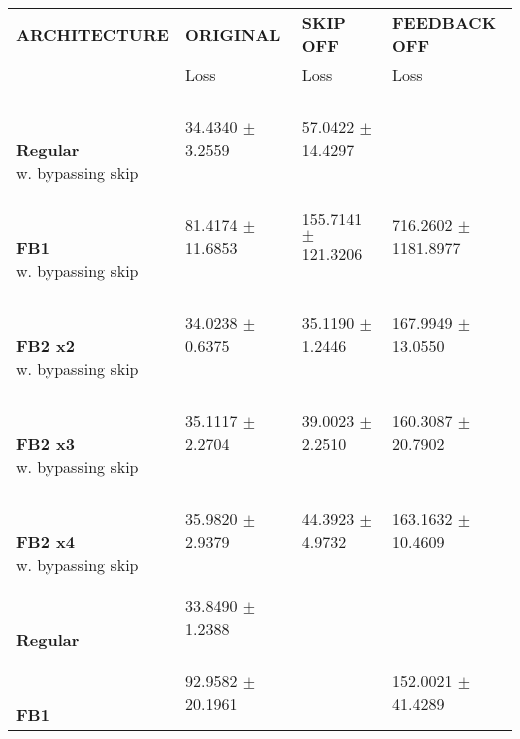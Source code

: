 
\begin{table}[ht]
    \centering
    \begin{tabular}{|>{\columncolor{gray!05}}l|l|l|l|}
        \hline
        \rowcolor{gray!20}
        \textbf{\footnotesize ARCHITECTURE} & \textbf{\footnotesize ORIGINAL} & \textbf{\footnotesize SKIP OFF} & \textbf{\footnotesize FEEDBACK OFF} \\

        \rowcolor{gray!20}
        & {\footnotesize Loss} & {\footnotesize Loss} & {\footnotesize Loss} \\
        \hline
\shortstack[l]{\\ {} \\ \textbf{Regular}\\{w. bypassing skip}} & 34.4340 $\pm$ 3.2559 & 57.0422 $\pm$ 14.4297 &  \\
 \hline 
\shortstack[l]{\\ {} \\ \textbf{FB1}\\{w. bypassing skip}} & 81.4174 $\pm$ 11.6853 & 155.7141 $\pm$ 121.3206 & 716.2602 $\pm$ 1181.8977 \\
 \hline 
\shortstack[l]{\\ {} \\ \textbf{FB2 x2}\\{w. bypassing skip}} & 34.0238 $\pm$ 0.6375 & 35.1190 $\pm$ 1.2446 & 167.9949 $\pm$ 13.0550 \\
 \hline 
\shortstack[l]{\\ {} \\ \textbf{FB2 x3}\\{w. bypassing skip}} & 35.1117 $\pm$ 2.2704 & 39.0023 $\pm$ 2.2510 & 160.3087 $\pm$ 20.7902 \\
 \hline 
\shortstack[l]{\\ {} \\ \textbf{FB2 x4}\\{w. bypassing skip}} & 35.9820 $\pm$ 2.9379 & 44.3923 $\pm$ 4.9732 & 163.1632 $\pm$ 10.4609 \\
 \hline 
\shortstack[l]{\\ {} \\ \textbf{Regular}\\{}} & 33.8490 $\pm$ 1.2388 &  &  \\
 \hline 
\shortstack[l]{\\ {} \\ \textbf{FB1}\\{}} & 92.9582 $\pm$ 20.1961 &  & 152.0021 $\pm$ 41.4289 \\

\end{tabular}
\end{table}
